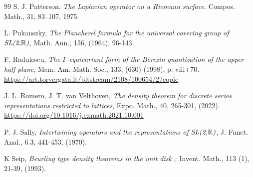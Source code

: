 \documentclass[11pt,reqno]{amsart}
\numberwithin{equation}{section}
\theoremstyle{plain}
\theoremstyle{definition}
\theoremstyle{remark}
\begin{document}
\begin{thebibliography}{99}
 S. J. Patterson. \emph{The Laplacian operator on a
Riemann surface.} Compos. Math., 31, 83--107, 1975.

 L. Pukanszky, \emph{The Plancherel formula for the universal
covering group of} $\emph{SL(2,}\mathbb{R}\emph{)}$, Math. Ann., 156,
(1964), 96-143.

 F. Radulescu, \emph{The }$\Gamma $\emph{-equivariant
form of the Berezin quantization of the upper half plane}, Mem. Am. Math.
Soc., 133, (630) (1998), p. viii+70. %
\url{https://art.torvergata.it/bitstream/2108/100654/2/copie}

 J. L. Romero, J. T. van Velthoven, \emph{The density theorem
for discrete series representations restricted to lattices}, Expo. Math.,
40, 265-301, (2022). \url{https://doi.org/10.1016/j.exmath.2021.10.001}

 P. J. Sally, \emph{Intertwining operators and the
representations of }$\emph{SL(2,}\mathbb{R}\emph{)}$, J. Funct. Anal., 6.3,
441-453, (1970).

 K Seip, \emph{Beurling type density theorems in the unit disk}%
,\ Invent. Math., 113 (1), 21-39, (1993).
\end{thebibliography}
\end{document}
